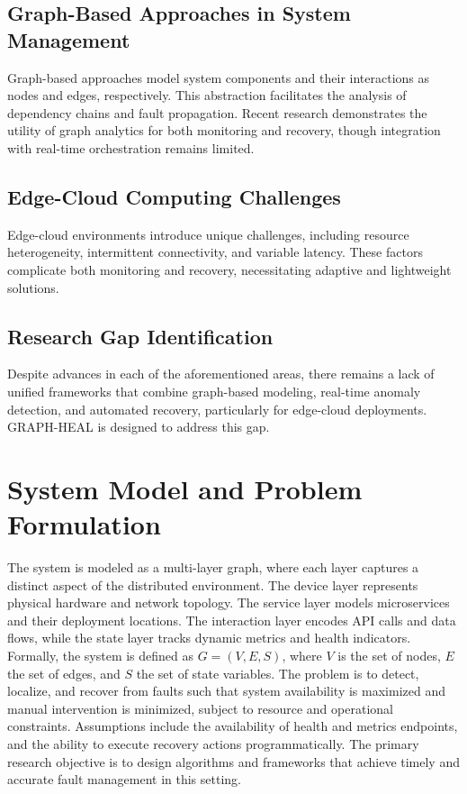 \documentclass[11pt,twocolumn]{article}
\begin{document}
\subsection{Graph-Based Approaches in System Management}
Graph-based approaches model system components and their interactions as nodes and edges, respectively. This abstraction facilitates the analysis of dependency chains and fault propagation. Recent research demonstrates the utility of graph analytics for both monitoring and recovery, though integration with real-time orchestration remains limited.

\subsection{Edge-Cloud Computing Challenges}
Edge-cloud environments introduce unique challenges, including resource heterogeneity, intermittent connectivity, and variable latency. These factors complicate both monitoring and recovery, necessitating adaptive and lightweight solutions.

\subsection{Research Gap Identification}
Despite advances in each of the aforementioned areas, there remains a lack of unified frameworks that combine graph-based modeling, real-time anomaly detection, and automated recovery, particularly for edge-cloud deployments. GRAPH-HEAL is designed to address this gap.

\section{System Model and Problem Formulation}
The system is modeled as a multi-layer graph, where each layer captures a distinct aspect of the distributed environment. The device layer represents physical hardware and network topology. The service layer models microservices and their deployment locations. The interaction layer encodes API calls and data flows, while the state layer tracks dynamic metrics and health indicators. Formally, the system is defined as $G = (V, E, S)$, where $V$ is the set of nodes, $E$ the set of edges, and $S$ the set of state variables. The problem is to detect, localize, and recover from faults such that system availability is maximized and manual intervention is minimized, subject to resource and operational constraints. Assumptions include the availability of health and metrics endpoints, and the ability to execute recovery actions programmatically. The primary research objective is to design algorithms and frameworks that achieve timely and accurate fault management in this setting.
\end{document}
